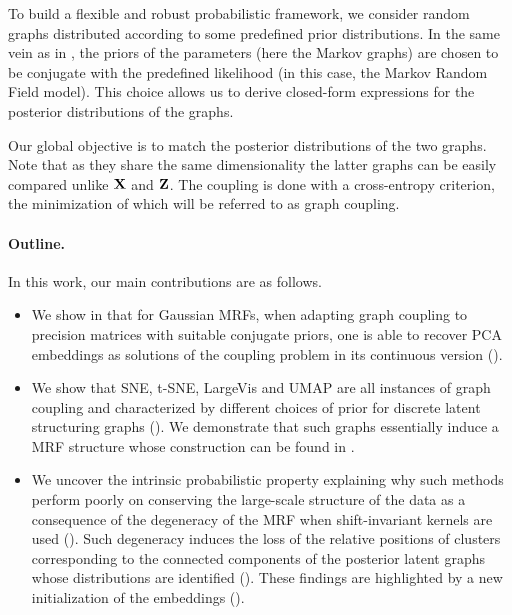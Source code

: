 To build a flexible and robust probabilistic framework, we consider random graphs distributed according to some predefined prior distributions. In the same vein as in , the priors of the parameters (here the Markov graphs) are chosen to be conjugate with the predefined likelihood (in this case, the Markov Random Field model). This choice allows us to derive closed-form expressions for the posterior distributions of the graphs.

Our global objective is to match the posterior distributions of the two graphs. Note that as they share the same dimensionality the latter graphs can be easily compared unlike $\mathbf{X}$ and $\mathbf{Z}$. The coupling is done with a cross-entropy criterion, the minimization of which will be referred to as graph coupling.

\paragraph{Outline.} 

In this work, our main contributions are as follows.

\begin{itemize}
    \item We show in  that for Gaussian MRFs, when adapting graph coupling to precision matrices with suitable conjugate priors, one is able to recover PCA embeddings as solutions of the coupling problem in its continuous version ().
    \item We show that SNE, t-SNE, LargeVis and UMAP are all instances of graph coupling and characterized by different choices of prior for discrete latent structuring graphs (). We demonstrate that such graphs essentially induce a MRF structure whose construction can be found in .
    \item We uncover the intrinsic probabilistic property explaining why such methods perform poorly on conserving the large-scale structure of the data as a consequence of the degeneracy of the MRF when shift-invariant kernels are used (). Such degeneracy induces the loss of the relative positions of clusters corresponding to the connected components of the posterior latent graphs whose distributions are identified (). These findings are highlighted by a new initialization of the embeddings ().
\end{itemize}
